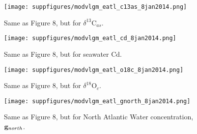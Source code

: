 \documentclass[agums]{aguplus}  %
\begin{document}
\begin{figure}
     \texttt{[image: suppfigures/modvlgm\_eatl\_c13as\_8jan2014.png]}
     \caption{Same as Figure 8, but for $\delta^{13}$C$_{as}$.}
\end{figure}

\begin{figure}
     \texttt{[image: suppfigures/modvlgm\_eatl\_cd\_8jan2014.png]}
     \caption{Same as Figure 8, but for seawater Cd.}
\end{figure}

\begin{figure}
     \texttt{[image: suppfigures/modvlgm\_eatl\_o18c\_8jan2014.png]}
     \caption{Same as Figure 8, but for $\delta^{18}$O$_{c}$.}
\end{figure}

\begin{figure}
     \texttt{[image: suppfigures/modvlgm\_eatl\_gnorth\_8jan2014.png]}
     \caption{Same as Figure 8, but for North Atlantic Water concentration, ${\bf g}_{north}$.}
\end{figure}







\end{document}
